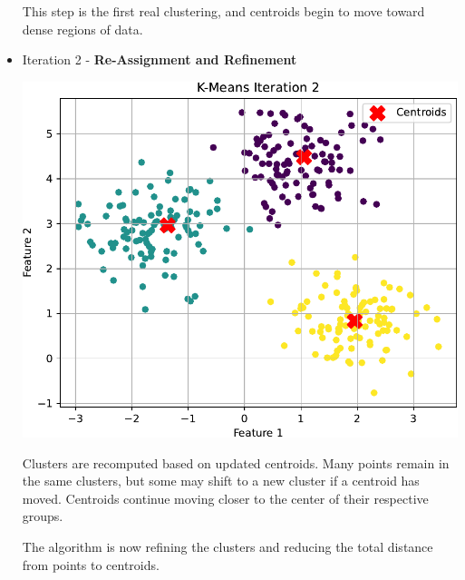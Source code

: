 \begin{examplebox}[: K-Means]
\begin{itemize}
        This step is the first real clustering, and centroids begin to move toward dense regions of data.


        \item Iteration 2 - \textbf{Re-Assignment and Refinement}
        \begin{center}
            \includegraphics[width=.7\textwidth]{img/k-means/iter_2.pdf}
        \end{center}
        Clusters are recomputed based on updated centroids. Many points remain in the same clusters, but some may shift to a new cluster if a centroid has moved. Centroids continue moving closer to the center of their respective groups.

        The algorithm is now refining the clusters and reducing the total distance from points to centroids.



\end{itemize}
\end{examplebox}
